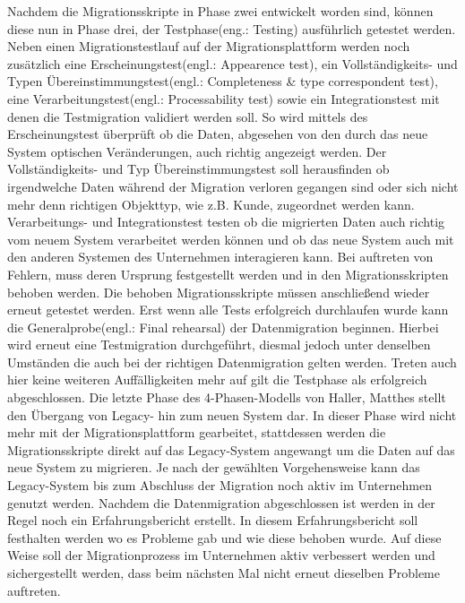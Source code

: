 Nachdem die Migrationsskripte in Phase zwei entwickelt worden sind, können diese nun in Phase drei, der Testphase(eng.: Testing) ausführlich getestet werden. Neben einen Migrationstestlauf auf der Migrationsplattform werden noch zusätzlich eine Erscheinungstest(engl.: Appearence test), ein Vollständigkeits- und Typen Übereinstimmungstest(engl.: Completeness \& type correspondent test), eine Verarbeitungstest(engl.: Processability test) sowie ein Integrationstest mit denen die Testmigration validiert werden soll.\citep[S. 8f]{klausMatthesSchulz-2012} So wird mittels des Erscheinungstest überprüft ob die Daten, abgesehen von den durch das neue System optischen Veränderungen, auch richtig angezeigt werden.\citep[S. 8f]{klausMatthesSchulz-2012} Der Vollständigkeits- und Typ Übereinstimmungstest soll herausfinden ob irgendwelche Daten während der Migration verloren gegangen sind oder sich nicht mehr denn richtigen Objekttyp, wie z.B. Kunde, zugeordnet werden kann.\citep[S. 9]{klausMatthesSchulz-2012} Verarbeitungs- und Integrationstest testen ob die migrierten Daten auch richtig vom neuem System verarbeitet werden können und ob das neue System auch mit den anderen Systemen des Unternehmen interagieren kann.\citep[S. 9]{klausMatthesSchulz-2012} Bei auftreten von Fehlern, muss deren Ursprung festgestellt werden und in den Migrationsskripten behoben werden. Die behoben Migrationsskripte müssen anschließend wieder erneut getestet werden. Erst wenn alle Tests erfolgreich durchlaufen wurde kann die Generalprobe(engl.: Final rehearsal) der Datenmigration beginnen. Hierbei wird erneut eine Testmigration durchgeführt, diesmal jedoch unter denselben Umständen die auch bei der richtigen Datenmigration gelten werden. Treten auch hier keine weiteren Auffälligkeiten mehr auf gilt die Testphase als erfolgreich abgeschlossen.\citep[S. 9f]{klausMatthesSchulz-2012}
\lb
Die letzte Phase des 4-Phasen-Modells von Haller, Matthes stellt den Übergang von Legacy- hin zum neuen System dar. In dieser Phase wird nicht mehr mit der Migrationsplattform gearbeitet, stattdessen werden die Migrationsskripte direkt auf das Legacy-System angewangt um die Daten auf das neue System zu migrieren.\citep[S. 10]{klausMatthesSchulz-2012} Je nach der gewählten Vorgehensweise kann das Legacy-System bis zum Abschluss der Migration noch aktiv im Unternehmen genutzt werden. 
Nachdem die Datenmigration abgeschlossen ist werden in der Regel noch ein Erfahrungsbericht erstellt. In diesem Erfahrungsbericht soll festhalten werden wo es Probleme gab und wie diese behoben wurde. Auf diese Weise soll der Migrationprozess im Unternehmen aktiv verbessert werden und sichergestellt werden, dass beim nächsten Mal nicht erneut dieselben Probleme auftreten.\citep[S. 10]{klausMatthesSchulz-2012}

